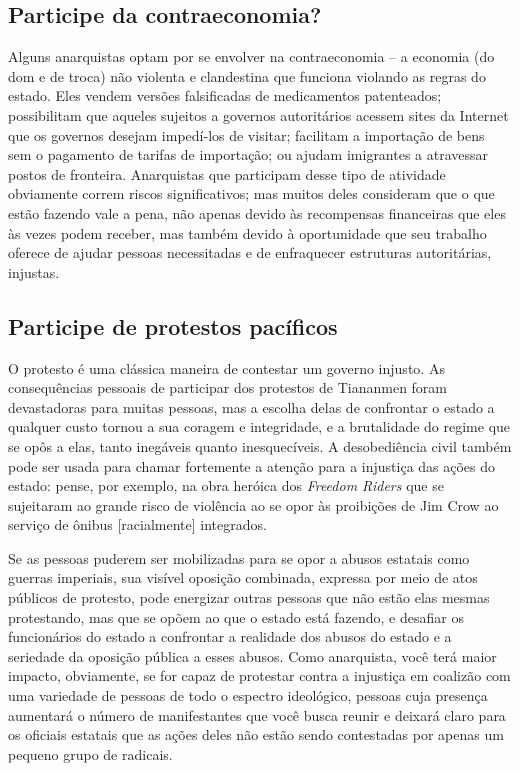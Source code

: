 \subsection*{Participe da contraeconomia?}

Alguns anarquistas optam por se envolver na contraeconomia -- a economia (do dom e de troca) não violenta e clandestina que funciona violando as regras do estado. Eles vendem versões falsificadas de medicamentos patenteados; possibilitam que aqueles sujeitos a governos autoritários acessem sites da Internet que os governos desejam impedí-los de visitar; facilitam a importação de bens sem o pagamento de tarifas de importação; ou ajudam imigrantes a atravessar postos de fronteira. Anarquistas que participam desse tipo de atividade obviamente correm riscos significativos; mas muitos deles consideram que o que estão fazendo vale a pena, não apenas devido às recompensas financeiras que eles às vezes podem receber, mas também devido à oportunidade que seu trabalho oferece de ajudar pessoas necessitadas e de enfraquecer estruturas autoritárias, injustas.

\subsection*{Participe de protestos pacíficos}

O protesto é uma clássica maneira de contestar um governo injusto. As consequências pessoais de participar dos protestos de Tiananmen foram devastadoras para muitas pessoas, mas a escolha delas de confrontar o estado a qualquer custo tornou a sua coragem e integridade, e a brutalidade do regime que se opôs a elas, tanto inegáveis quanto inesquecíveis. A desobediência civil também pode ser usada para chamar fortemente a atenção para a injustiça das ações do estado: pense, por exemplo, na obra heróica dos \emph{Freedom Riders} que se sujeitaram ao grande risco de violência ao se opor às proibições de Jim Crow ao serviço de ônibus [racialmente] integrados. 

Se as pessoas puderem ser mobilizadas para se opor a abusos estatais como guerras imperiais, sua visível oposição combinada, expressa por meio de atos públicos de protesto, pode energizar outras pessoas que não estão elas mesmas protestando, mas que se opõem ao que o estado está fazendo, e desafiar os funcionários do estado a confrontar a realidade dos abusos do estado e a seriedade da oposição pública a esses abusos. Como anarquista, você terá maior impacto, obviamente, se for capaz de protestar contra a injustiça em coalizão com uma variedade de pessoas de todo o espectro ideológico, pessoas cuja presença aumentará o número de manifestantes que você busca reunir e deixará claro para os oficiais estatais que as ações deles não estão sendo contestadas por apenas um pequeno grupo de radicais.

